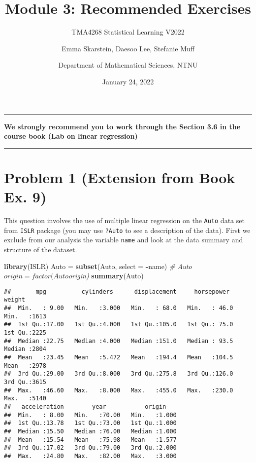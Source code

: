 \documentclass[]{article}
\title{Module 3: Recommended Exercises}
\subtitle{TMA4268 Statistical Learning V2022}
\author{Emma Skarstein, Daesoo Lee, Stefanie Muff \and Department of Mathematical Sciences, NTNU}
\date{January 24, 2022}
\newenvironment{Shaded}{\begin{snugshade}}{\end{snugshade}}
\newcommand{\CommentTok}[1]{\textcolor[rgb]{0.56,0.35,0.01}{\textit{#1}}}
\newcommand{\DataTypeTok}[1]{\textcolor[rgb]{0.13,0.29,0.53}{#1}}
\newcommand{\KeywordTok}[1]{\textcolor[rgb]{0.13,0.29,0.53}{\textbf{#1}}}
\newcommand{\NormalTok}[1]{#1}
\newcommand{\OperatorTok}[1]{\textcolor[rgb]{0.81,0.36,0.00}{\textbf{#1}}}
\newcommand{\StringTok}[1]{\textcolor[rgb]{0.31,0.60,0.02}{#1}}
\begin{document}
\maketitle

\begin{center}\rule{0.5\linewidth}{0.5pt}\end{center}

\textbf{We strongly recommend you to work through the Section 3.6 in the
course book (Lab on linear regression)}

\begin{center}\rule{0.5\linewidth}{0.5pt}\end{center}

\hypertarget{problem-1-extension-from-book-ex.-9}{%
\section{Problem 1 (Extension from Book Ex.
9)}\label{problem-1-extension-from-book-ex.-9}}

This question involves the use of multiple linear regression on the
\texttt{Auto} data set from \texttt{ISLR} package (you may use
\texttt{?Auto} to see a description of the data). First we exclude from
our analysis the variable \texttt{name} and look at the data summary and
structure of the dataset.

\begin{Shaded}
\begin{Highlighting}[]
\KeywordTok{library}\NormalTok{(ISLR)}
\NormalTok{Auto =}\StringTok{ }\KeywordTok{subset}\NormalTok{(Auto, }\DataTypeTok{select =} \OperatorTok{-}\NormalTok{name)}
\CommentTok{# Auto$origin = factor(Auto$origin)}
\KeywordTok{summary}\NormalTok{(Auto)}
\end{Highlighting}
\end{Shaded}

\begin{verbatim}
##       mpg          cylinders      displacement     horsepower        weight    
##  Min.   : 9.00   Min.   :3.000   Min.   : 68.0   Min.   : 46.0   Min.   :1613  
##  1st Qu.:17.00   1st Qu.:4.000   1st Qu.:105.0   1st Qu.: 75.0   1st Qu.:2225  
##  Median :22.75   Median :4.000   Median :151.0   Median : 93.5   Median :2804  
##  Mean   :23.45   Mean   :5.472   Mean   :194.4   Mean   :104.5   Mean   :2978  
##  3rd Qu.:29.00   3rd Qu.:8.000   3rd Qu.:275.8   3rd Qu.:126.0   3rd Qu.:3615  
##  Max.   :46.60   Max.   :8.000   Max.   :455.0   Max.   :230.0   Max.   :5140  
##   acceleration        year           origin     
##  Min.   : 8.00   Min.   :70.00   Min.   :1.000  
##  1st Qu.:13.78   1st Qu.:73.00   1st Qu.:1.000  
##  Median :15.50   Median :76.00   Median :1.000  
##  Mean   :15.54   Mean   :75.98   Mean   :1.577  
##  3rd Qu.:17.02   3rd Qu.:79.00   3rd Qu.:2.000  
##  Max.   :24.80   Max.   :82.00   Max.   :3.000
\end{verbatim}
\end{document}
